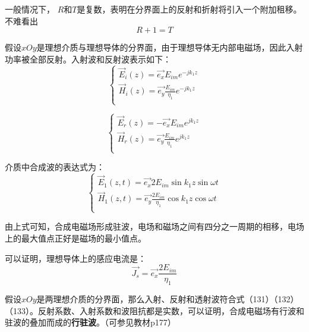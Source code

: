 \documentclass[UTF8,a4paper,11pt]{article}
\begin{document}
一般情况下， $R$和$T$是复数，表明在分界面上的反射和折射将引入一个附加租移。不难看出
\begin{equation}
R+1=T
\end{equation}

假设$xOy$是理想介质与理想导体的分界面，由于理想导体无内部电磁场，因此入射功率被全部反射。入射波和反射波表示如下：
\begin{equation}
\begin{cases}
\overrightarrow{E}_i(z)=\overrightarrow{e_x}E_{im}e^{-jk_1z}\\
\overrightarrow{H}_i(z)=\overrightarrow{e_y}\frac{E_{im}}{\eta_1}e^{-jk_1z}\\
\end{cases}
\end{equation}

\begin{equation}
\begin{cases}
\overrightarrow{E}_r(z)=-\overrightarrow{e_x}E_{im}e^{jk_1z}\\
\overrightarrow{H}_r(z)=\overrightarrow{e_y}\frac{E_{im}}{\eta_1}e^{jk_1z}\\
\end{cases}
\end{equation}

介质中合成波的表达式为：
\begin{equation}
\begin{cases}
\overrightarrow{E}_1(z,t)=\overrightarrow{e_x}2E_{im}\sin k_1z\sin\omega t\\
\overrightarrow{H}_1(z,t)=\overrightarrow{e_y}\frac{2E_{im}}{\eta_1}\cos k_1z\cos\omega t\\
\end{cases}
\end{equation}

由上式可知，合成电磁场形成驻波，电场和磁场之间有四分之一周期的相移，电场上的最大值点正好是磁场的最小值点。

可以证明，理想导体上的感应电流是：
\begin{equation}
\overrightarrow{J_s}=\overrightarrow{e_x}\frac{2E_{im}}{\eta_1}
\end{equation}

假设$xOy$是两理想介质的分界面，那么入射、反射和透射波符合式（131）（132）（133）。反射系数、入射系数和波阻抗都是实数，可以证明，合成电磁场有行波和驻波的叠加而成的\textbf{行驻波}。（可参见教材p177）
\end{document}
